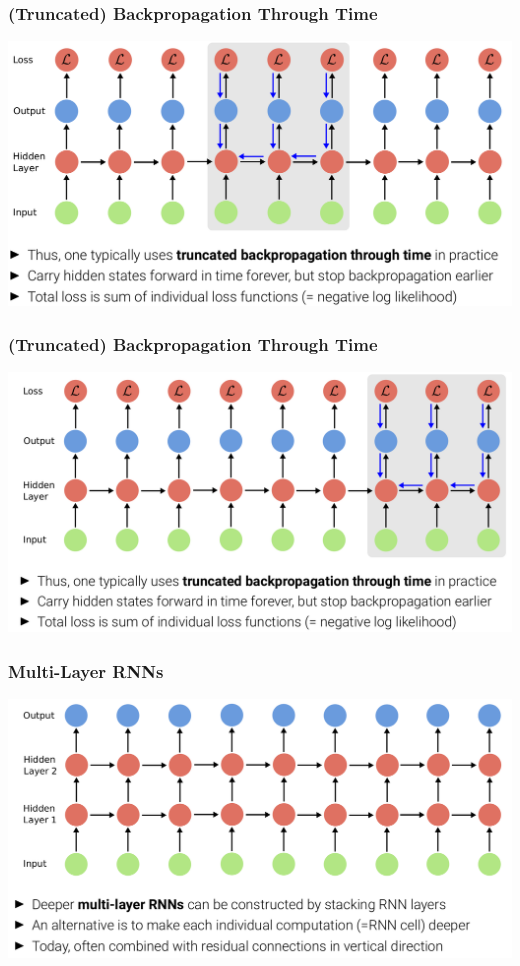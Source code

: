 \documentclass[10pt]{beamer}
\begin{document}
\begin{frame}
  \frametitle{(Truncated) Backpropagation Through Time}
\begin{center}
\includegraphics[width=.9\textwidth]{images/s8}
\end{center}
\end{frame}


\begin{frame}
  \frametitle{(Truncated) Backpropagation Through Time}
\begin{center}
\includegraphics[width=.9\textwidth]{images/s9}
\end{center}
\end{frame}


\begin{frame}
  \frametitle{Multi-Layer RNNs}
\begin{center}
\includegraphics[width=.9\textwidth]{images/s10}
\end{center}
\end{frame}
\end{document}
